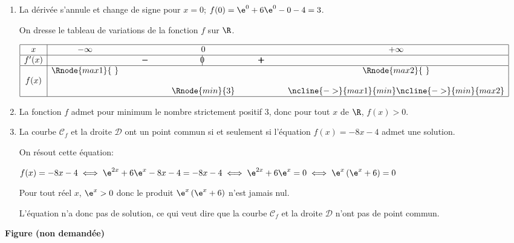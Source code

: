 \begin{enumerate}
\item La dérivée s'annule et change de signe pour $x=0$; $f(0) = \e^{0} + 6\e^{0} -0 -4 = 3$.

On dresse le tableau de variations de la fonction $f$ sur $\R$.

\begin{center}
{\renewcommand{\arraystretch}{1.3}
\def\esp{\hspace*{1.5cm}}%
\def\hauteur{0pt}%
$\begin{array}{|c| *4{c} c|}
\hline
 x & -\infty & \esp & 0 & \esp & +\infty \\
 \hline
f'(x) &  &  \pmb{-} & \vline\hspace{-2.7pt}0 & \pmb{+} & \\  
\hline
  & \Rnode{max1}{~}  &  &  &  & \Rnode{max2}{~}   \\
f(x) & &  & & &  \rule{0pt}{\hauteur} \\
 &  & &   \Rnode{min}{3} & & \rule{0pt}{\hauteur}
\ncline{->}{max1}{min} \ncline{->}{min}{max2}\\
\hline
\end{array}$
}
\end{center}

\item %
La fonction $f$ admet pour minimum le nombre strictement positif 3, donc pour tout $x$ de $\R$, $f(x)>0$.

\item La courbe $\mathcal{C}_f$ et la droite $\mathcal{D}$ ont un point commun si et seulement si l'équation $f(x)=-8x-4$ admet une solution.

On résout cette équation:

$f(x)=-8x-4
\iff
\e^{2x} + 6 \e^{x} - 8x-4 = -8x-4
\iff
\e^{2x} + 6 \e^{x} = 0
\iff
\e^{x} \left (\e^{x}+6\right ) = 0$

Pour tout réel $x$, $\e^{x}>0$ donc le produit $\e^{x} \left (\e^{x}+6\right )$ n'est jamais nul.

L'équation n'a donc pas de solution, ce qui veut dire que la courbe $\mathcal{C}_f$ et la droite $\mathcal{D}$ n'ont pas de point commun.



\end{enumerate}


\begin{center}
\large \textbf{Figure (non demandée)}
\end{center}

